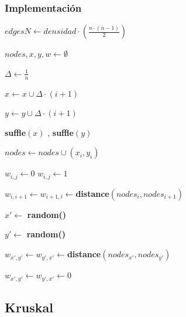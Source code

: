 \documentclass[letterpaper,11pt]{article}
\begin{document}
        \subsubsection{Implementación}
        \begin{algorithm}[H]
            $edgesN \gets densidad \cdot (\frac{n \cdot (n-1)}{2})$

            $nodes , x , y, w \gets \emptyset$

            $\Delta \gets \frac{1}{n}$

            {
                $x \gets x \cup \Delta \cdot (i+1)$
                
                $y \gets y \cup \Delta \cdot (i+1)$
            }
            \textbf{suffle$(x)$} , \textbf{suffle$(y)$}

            {
                $nodes \gets nodes \cup (x_i , y_i)$
            }

            {
                {
                    {
                        $w_{i,j} \gets 0$
                    } 
                    {
                        $w_{i,j} \gets 1$
                    }
                }                
            }

            {
                $w_{i,i+1} \gets w_{i+1,i} \gets $\textbf{distance$(nodes_i, nodes_{i+1})$}
            }

            {
                $x' \gets $ \textbf{random()}

                $y' \gets $ \textbf{random()}

                {
                    $w_{x',y'} \gets w_{y',x'} \gets $\textbf{distance$(nodes_{x'}, nodes_{y'})$}
                    
                    $w_{x',y'} \gets w_{y',x'} \gets 0$
                }
            }


        \end{algorithm}

    \newpage
    \subsection{Kruskal}
\end{document}
